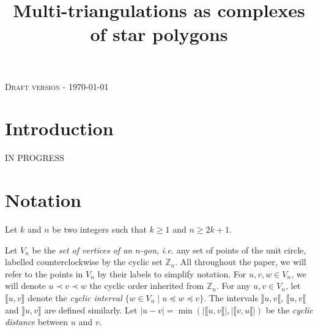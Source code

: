 \documentclass[12pt]{amsart}
\begin{document}
 

\newtheorem{theorem}{Theorem}
\newtheorem{proposition}{Proposition}
\newtheorem{lemma}{Lemma}
\newtheorem{corollary}{Corollary}
\newtheorem{definition}{Definition}
\newenvironment{remark}{\medskip\noindent{\textbf{Remark.}}}{\medskip}
\newenvironment{bibremark}{\begin{footnotesize}\medskip\noindent{\textbf{Bibliographic remark.}}}{\end{footnotesize}\medskip}
\newcommand{\cl}{\ensuremath{\prec}}
\newcommand{\cle}{\ensuremath{\preccurlyeq}}

\makeatletter
\newlength{\earraycolsep}
\setlength{\earraycolsep}{2pt}
\def\eqnarray{\stepcounter{equation}\let\@currentlabel%
\theequation
\global\@eqnswtrue\m@th
\global\@eqcnt\z@\tabskip\@centering\let\\\@eqncr
$$\halign to\displaywidth\bgroup\@eqnsel\hskip\@centering
$\displaystyle\tabskip\z@{##}$&\global\@eqcnt\@ne
\hskip 2\earraycolsep \hfil$\displaystyle{##}$\hfil
&\global\@eqcnt\tw@ \hskip 2\earraycolsep
$\displaystyle\tabskip\z@{##}$\hfil
\tabskip\@centering&\llap{##}\tabskip\z@\cr}
\makeatother

\title{Multi-triangulations as complexes of star polygons}
\maketitle

\begin{center}
\textsc{Draft version} - \today
\end{center}

\section{Introduction}\label{sectionintroduction}

IN PROGRESS


\section{Notation}\label{sectionnotation}

Let $k$ and $n$ be two integers such that $k\ge 1$ and $n\ge 2k+1$.

Let $V_n$ be the \emph{set of vertices of an $n$-gon}, {\it i.e.} any set of points of the unit circle, labelled counterclockwise by the cyclic set $\mathbb{Z}_n$.
All throughout the paper, we will refer to the points in $V_n$ by their labels to simplify notation.
For $u,v,w\in V_n$, we will denote $u\cl v\cl w$ the cyclic order inherited from $\mathbb{Z}_n$.
For any $u,v\in V_n$, let $\llbracket u,v\rrbracket$ denote the \emph{cyclic interval} $\{w\in V_n\;|\; u\cle w\cle v\}$.
The intervals $\rrbracket u,v\llbracket$, $\llbracket u,v\llbracket$ and $\rrbracket u,v\rrbracket$ are defined similarly.
Let $|u-v|=\min(|\llbracket u, v\llbracket|,|\llbracket v, u\llbracket|)$ be the \emph{cyclic distance} between $u$ and $v$.
\end{document}

